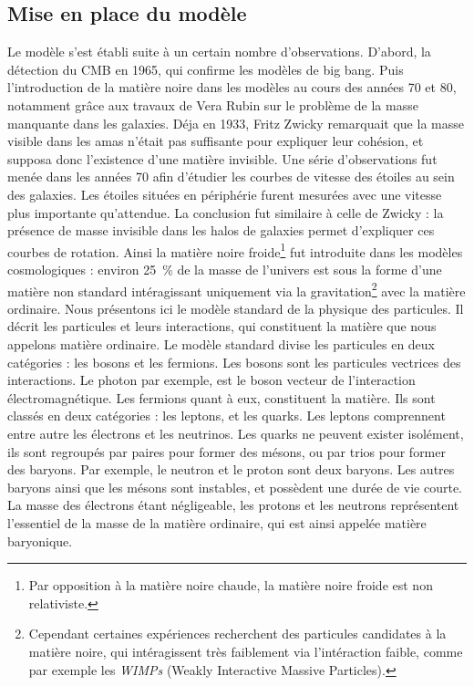 \subsection{Mise en place du modèle}
Le modèle s'est établi suite à un certain nombre d'observations. D'abord, la détection du CMB en 1965, qui confirme les modèles de big bang.
Puis l'introduction de la matière noire dans les modèles au cours des années 70 et 80, notamment grâce aux travaux de Vera Rubin sur le problème de la masse manquante dans les galaxies. Déja en 1933, Fritz Zwicky remarquait que la masse visible dans les amas n'était pas suffisante pour expliquer leur cohésion, et supposa donc l'existence d'une matière invisible. Une série d'observations fut menée dans les années 70 afin d'étudier les courbes de vitesse des étoiles au sein des galaxies. Les étoiles situées en périphérie furent mesurées avec une vitesse plus importante qu'attendue. La conclusion fut similaire à celle de Zwicky : la présence de masse invisible dans les halos de galaxies permet d'expliquer ces courbes de rotation. Ainsi la matière noire froide\footnote{Par opposition à la matière noire chaude, la matière noire froide est non relativiste.} fut introduite dans les modèles cosmologiques :
environ \SI{25}{\percent} de la masse de l'univers est sous la forme d'une matière non standard intéragissant uniquement via la gravitation\footnote{Cependant certaines expériences recherchent des particules candidates à la matière noire, qui intéragissent très faiblement via l'intéraction faible, comme par exemple les \emph{WIMPs} (Weakly Interactive Massive Particles).} avec la matière ordinaire.
Nous présentons ici le modèle standard de la physique des particules. Il décrit les particules et leurs interactions, qui constituent la matière que nous appelons matière ordinaire.
Le modèle standard divise les particules en deux catégories : les bosons et les fermions. Les bosons sont les particules vectrices des interactions. Le photon par exemple, est le boson vecteur de l'interaction électromagnétique. Les fermions quant à eux, constituent la matière. Ils sont classés en deux catégories : les leptons, et les quarks. Les leptons comprennent entre autre les électrons et les neutrinos. Les quarks ne peuvent exister isolément, ils sont regroupés par paires pour former des mésons, ou par trios pour former des baryons. Par exemple, le neutron et le proton sont deux baryons. Les autres baryons ainsi que les mésons sont instables, et possèdent une durée de vie courte.
La masse des électrons étant négligeable, les protons et les neutrons représentent l’essentiel de la masse de la matière ordinaire, qui est ainsi appelée matière baryonique.

